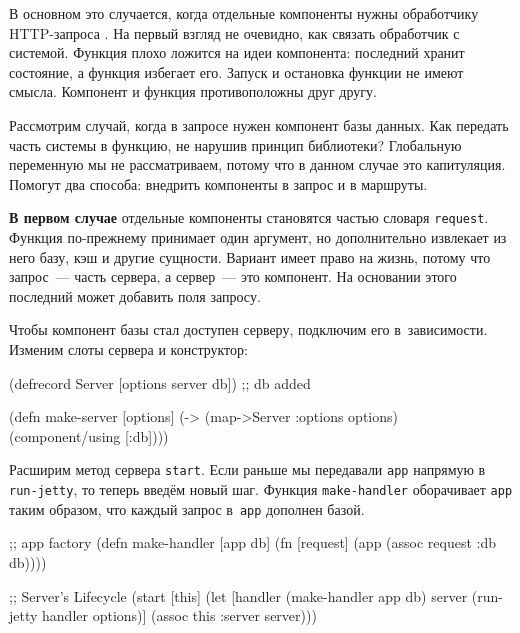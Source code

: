 В основном это случается, когда отдельные компоненты нужны обработчику
HTTP-запроса . На первый взгляд не очевидно, как связать
обработчик с системой. Функция плохо ложится на идеи компонента: последний
хранит состояние, а функция избегает его. Запуск и остановка функции не имеют
смысла. Компонент и функция противоположны друг другу.

Рассмотрим случай, когда в запросе нужен компонент базы данных. Как передать
часть системы в функцию, не нарушив принцип библиотеки? Глобальную переменную мы
не рассматриваем, потому что в данном случае это капитуляция. Помогут два
способа: внедрить компоненты в запрос и в маршруты.

\textbf{В первом случае} отдельные компоненты становятся частью словаря
\verb|request|. Функция по-прежнему принимает один аргумент, но дополнительно
извлекает из него базу, кэш и другие сущности. Вариант имеет право на жизнь,
потому что запрос~--- часть сервера, а сервер~--- это компонент. На основании
этого последний может добавить поля запросу.

Чтобы компонент базы стал доступен серверу, подключим его в~зависимости. Изменим
слоты сервера и конструктор:

\begin{english}
  \begin{clojure}
(defrecord Server
  [options server db]) ;; db added

(defn make-server
  [options]
  (-> (map->Server {:options options})
      (component/using [:db])))
  \end{clojure}
\end{english}

Расширим метод сервера \verb|start|. Если раньше мы передавали \verb|app|
напрямую в \verb|run-jetty|, то теперь введём новый шаг. Функция
\texttt{make\--hand\-ler} оборачивает \verb|app| таким образом, что каждый запрос
в~\verb|app| дополнен базой.

\ifx\DEVICETYPE\MOBILE

\begin{english}
  \begin{clojure}
;; app factory
(defn make-handler [app db]
  (fn [request]
    (app (assoc request :db db))))

;; Server's Lifecycle
(start [this]
  (let [handler (make-handler app db)
        server (run-jetty handler
                 options)]
    (assoc this :server server)))
  \end{clojure}
\end{english}

